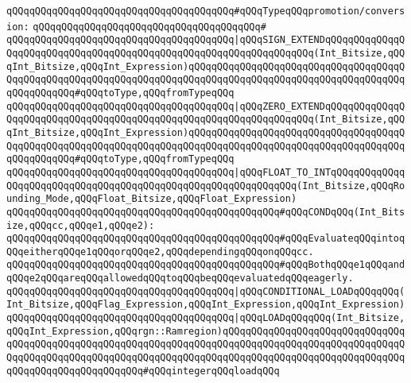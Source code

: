 \verb|qQQqqQQqqQQqqQQqqQQqqQQqqQQqqQQqqQQqqQQq#qQQqTypeqQQqpromotion/conversion:|\newline
\verb|qQQqqQQqqQQqqQQqqQQqqQQqqQQqqQQqqQQqqQQq#|\newline
\verb|qQQqqQQqqQQqqQQqqQQqqQQqqQQqqQQqqQQqqQQq|\verb#|qQQqSIGN_EXTENDqQQqqQQqqQQqqQQqqQQqqQQqqQQqqQQqqQQqqQQqqQQqqQQqqQQqqQQqqQQqqQQqqQQq(Int_Bitsize,qQQqInt_Bitsize,qQQqInt_Expression)qQQqqQQqqQQqqQQqqQQqqQQqqQQqqQQqqQQqqQQqqQQqqQQqqQQqqQQqqQQqqQQqqQQqqQQqqQQqqQQqqQQqqQQqqQQqqQQqqQQqqQQqqQQqqQQqqQQqqQQq#\verb|#qQQqtoType,qQQqfromTypeqQQq|\newline
\verb|qQQqqQQqqQQqqQQqqQQqqQQqqQQqqQQqqQQqqQQq|\verb#|qQQqZERO_EXTENDqQQqqQQqqQQqqQQqqQQqqQQqqQQqqQQqqQQqqQQqqQQqqQQqqQQqqQQqqQQqqQQqqQQq(Int_Bitsize,qQQqInt_Bitsize,qQQqInt_Expression)qQQqqQQqqQQqqQQqqQQqqQQqqQQqqQQqqQQqqQQqqQQqqQQqqQQqqQQqqQQqqQQqqQQqqQQqqQQqqQQqqQQqqQQqqQQqqQQqqQQqqQQqqQQqqQQqqQQqqQQq#\verb|#qQQqtoType,qQQqfromTypeqQQq|\newline
\verb|qQQqqQQqqQQqqQQqqQQqqQQqqQQqqQQqqQQqqQQq|\verb#|qQQqFLOAT_TO_INTqQQqqQQqqQQqqQQqqQQqqQQqqQQqqQQqqQQqqQQqqQQqqQQqqQQqqQQqqQQqqQQq(Int_Bitsize,qQQqRounding_Mode,qQQqFloat_Bitsize,qQQqFloat_Expression)#\newline
\newline
\newline
\verb|qQQqqQQqqQQqqQQqqQQqqQQqqQQqqQQqqQQqqQQqqQQqqQQq#qQQqCONDqQQq(Int_Bitsize,qQQqcc,qQQqe1,qQQqe2):|\newline
\verb|qQQqqQQqqQQqqQQqqQQqqQQqqQQqqQQqqQQqqQQqqQQqqQQq#qQQqEvaluateqQQqintoqQQqeitherqQQqe1qQQqorqQQqe2,qQQqdependingqQQqonqQQqcc.|\newline
\verb|qQQqqQQqqQQqqQQqqQQqqQQqqQQqqQQqqQQqqQQqqQQqqQQq#qQQqBothqQQqe1qQQqandqQQqe2qQQqareqQQqallowedqQQqtoqQQqbeqQQqevaluatedqQQqeagerly.|\newline
\newline
\verb|qQQqqQQqqQQqqQQqqQQqqQQqqQQqqQQqqQQqqQQq|\verb#|qQQqCONDITIONAL_LOADqQQqqQQq(Int_Bitsize,qQQqFlag_Expression,qQQqInt_Expression,qQQqInt_Expression)#\newline
\newline
\verb|qQQqqQQqqQQqqQQqqQQqqQQqqQQqqQQqqQQqqQQq|\verb#|qQQqLOADqQQqqQQq(Int_Bitsize,qQQqInt_Expression,qQQqrgn::Ramregion)qQQqqQQqqQQqqQQqqQQqqQQqqQQqqQQqqQQqqQQqqQQqqQQqqQQqqQQqqQQqqQQqqQQqqQQqqQQqqQQqqQQqqQQqqQQqqQQqqQQqqQQqqQQqqQQqqQQqqQQqqQQqqQQqqQQqqQQqqQQqqQQqqQQqqQQqqQQqqQQqqQQqqQQqqQQqqQQqqQQqqQQqqQQqqQQqqQQq#\verb|#qQQqintegerqQQqloadqQQq|\newline
\newline
